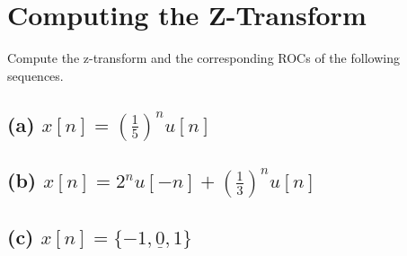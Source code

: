 \documentclass[11pt]{article}
\begin{document}
\section{Computing the Z-Transform}
Compute the z-transform and the corresponding ROCs of the following sequences.

\subsection*{(a) $x[n]=\left(\frac{1}{5}\right)^nu[n]$}

%

\subsection*{(b) $x[n]=2^nu[-n]+\left(\frac{1}{3}\right)^nu[n]$}

%
%
%

\subsection*{(c) $x[n]=\{-1,\underline{0},1\}$}

%



\end{document}
